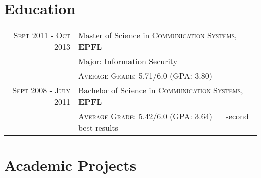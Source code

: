\documentclass[a4paper,10pt]{article} %
\newcommand\Bot{\rule[-1.2ex]{0pt}{0pt}} %
\begin{document}
\section{Education}

\begin{tabular}{rl}	
\textsc{Sept 2011 - Oct 2013} & Master of Science in \textsc{Communication Systems}, \textbf{EPFL}\\
                              & Major: Information Security\\
                              &\normalsize \textsc{Average Grade}: 5.71/6.0
    (GPA: 3.80) \Bot\\


\textsc{Sept 2008 - July 2011} & Bachelor of Science in \textsc{Communication Systems}, \textbf{EPFL} \\
                               &\normalsize \textsc{Average Grade}: 5.42/6.0
    (GPA: 3.64) --- second best results \Bot\\



\end{tabular}


\section{Academic Projects}
\end{document}
